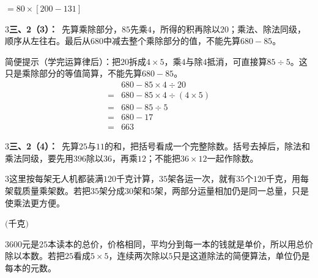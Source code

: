 \documentclass[multi=snippet,border={5bp 20bp 5bp 5bp}]{standalone}
\newenvironment{snippet}[3]{\begin{minipage}{#1bp}\color{answerred}\fontsize{#2}{#3}\selectfont\raggedright}{\end{minipage}}
\begin{document}
\begin{snippet}{92.05938110351565}{10}{12.8}\SourceSans\setlength{\mathindent}{2bp}\(\displaystyle=80\times[200-131]\)\end{snippet}
\begin{snippet}{505}{11.5}{14}\begin{multicols}{3}\raggedcolumns \textbf{三、2（3）：}\ 先算乘除部分，\(85\)\allowbreak 先乘\(4\)\allowbreak ，所得的积再除以\(20\)\allowbreak ；乘法、除法同级，顺序从左往右。最后从\(680\)\allowbreak 中减去整个乘除部分的值，不能先算\(680-85\)\allowbreak 。\par 简便提示（学完运算律后）：把\(20\)\allowbreak 拆成\(4\times5\)\allowbreak ，乘\(4\)\allowbreak 与除\(4\)\allowbreak 抵消，可直接算\(85\div5\)\allowbreak 。这只是乘除部分的等值简算，不能先算\(680-85\)\allowbreak 。\[\begin{aligned}&680-85\times4\div20\\={}&680-85\times4\div(4\times5)\\={}&680-85\div5\\={}&680-17\\={}&663\end{aligned}\]\end{multicols}\end{snippet}
\begin{snippet}{505}{11.5}{14}\begin{multicols}{3}\raggedcolumns \textbf{三、2（4）：}\ 先算\(25\)\allowbreak 与\(11\)\allowbreak 的和，把括号看成一个完整除数。括号去掉后，除法和乘法同级，要先用\(396\)\allowbreak 除以\(36\)\allowbreak ，再乘\(12\)\allowbreak ；不能把\(36\times12\)\allowbreak 一起作除数。\end{multicols}\end{snippet}
\begin{snippet}{505}{11.5}{14}\begin{multicols}{3}\raggedcolumns 这里按每架无人机都装满\(120\)\allowbreak 千克计算，\(35\)\allowbreak 架各运一次，就有\(35\)\allowbreak 个\(120\)\allowbreak 千克，用每架载质量乘架数。若把\(35\)\allowbreak 架分成\(30\)\allowbreak 架和\(5\)\allowbreak 架，两部分运量相加仍是同一总量，只是使乘法更方便。\end{multicols}\end{snippet}
\begin{snippet}{80}{10.0}{14}\SourceSans\setlength{\mathindent}{2bp}\(\text{(千克)}\)\end{snippet}
\begin{snippet}{505}{11.5}{14}\begin{multicols}{3}\raggedcolumns \(600\)\allowbreak 元是\(25\)\allowbreak 本读本的总价，价格相同，平均分到每一本的钱就是单价，所以用总价除以本数。若把\(25\)\allowbreak 看成\(5\times5\)\allowbreak ，连续两次除以\(5\)\allowbreak 只是这道除法的简便算法，单位仍是每本的元数。\end{multicols}\end{snippet}
\end{document}
